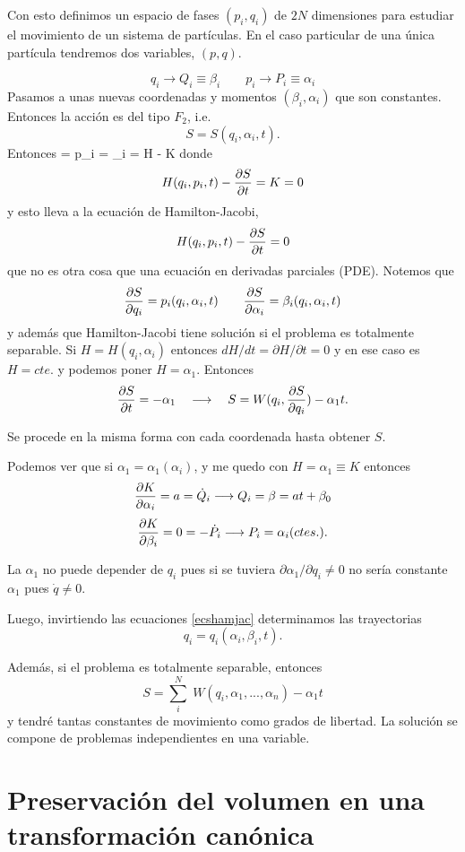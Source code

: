 \documentclass[10pt,oneside]{CBFT_book}
\begin{document}
Con esto definimos un espacio de fases $(p_i,q_i)$ de $2N$ dimensiones para estudiar el movimiento de un sistema de partículas.
En el caso particular de una única partícula tendremos dos variables, $(p,q)$.

\[
	q_i \longrightarrow Q_i \equiv \beta_i \qquad p_i \longrightarrow P_i \equiv \alpha_i
\]
Pasamos a unas nuevas coordenadas y momentos $(\beta_i,\alpha_i)$ que son constantes. Entonces
la acción es del tipo $F_2$, i.e.
\[
	S = S(q_i, \alpha_i, t).
\]
Entonces
\be
	 = p_i \qquad {} = \beta_i \qquad {} = H - K  
\label{ecshamjac}	
\ee
donde 
\[
	H(q_i,p_i,t) - \frac{\partial^{\hspace{-0.05em}} {S}}{\partial {t}^{\hspace{-0.05em}}} = K = 0
\]
y esto lleva a la ecuación de Hamilton-Jacobi,
\[
	H(q_i,p_i,t) - \frac{\partial^{\hspace{-0.05em}} {S}}{\partial {t}^{\hspace{-0.05em}}} = 0
\]
que no es otra cosa que una ecuación en derivadas parciales (PDE). Notemos que 
\[
	\frac{\partial^{\hspace{-0.05em}} {S}}{\partial {q_i}^{\hspace{-0.05em}}} = p_i(q_i,\alpha_i,t) \qquad \frac{\partial^{\hspace{-0.05em}} {S}}{\partial {\alpha_i}^{\hspace{-0.05em}}} = \beta_i(q_i,\alpha_i,t)
\]
y además que Hamilton-Jacobi tiene solución si el problema es totalmente separable.
Si $H=H(q_i,\alpha_i)$ entonces $dH/dt = \partial H/\partial t=0$ y en ese caso es $H=cte.$ y
podemos poner $H=\alpha_1$.
Entonces
\[
	\frac{\partial^{\hspace{-0.05em}} {S}}{\partial {t}^{\hspace{-0.05em}}} = -\alpha_1 \quad \longrightarrow \quad S=W(q_i,\frac{\partial^{\hspace{-0.05em}} {S}}{\partial {q_i}^{\hspace{-0.05em}}}) -\alpha_1 t .
\]

Se procede en la misma forma con cada coordenada hasta obtener $S$.

Podemos ver que si $\alpha_1 = \alpha_1(\alpha_i)$, y me quedo con $H=\alpha_1 \equiv K$ entonces
\[
	\frac{\partial^{\hspace{-0.05em}} {K}}{\partial {\alpha_i}^{\hspace{-0.05em}}} = a = \dot{Q}_i \longrightarrow Q_i = \beta = a t + \beta_0 
\]
\[
	\frac{\partial^{\hspace{-0.05em}} {K}}{\partial {\beta_i}^{\hspace{-0.05em}}} = 0 = -\dot{P}_i \longrightarrow P_i = \alpha_i (ctes.).
\]

La $\alpha_1$ no puede depender de $q_i$ pues si se tuviera $\partial \alpha_1 /\partial q_i \neq 0$ 
no sería constante $\alpha_1$ pues $\dot{q}\neq 0$.

Luego, invirtiendo las ecuaciones \eqref{ecshamjac} determinamos las trayectorias
\[
	q_i = q_i(\alpha_i, \beta_i, t).
\]

Además, si el problema es totalmente separable, entonces
\[
	S = \sum_i^N \; W(q_i, \alpha_1,...,\alpha_n) - \alpha_1 t
\]
y tendré tantas constantes de movimiento como grados de libertad. La solución se compone de problemas
independientes en una variable.

\section{Preservación del volumen en una transformación canónica}
\end{document}
